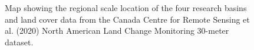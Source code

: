 \documentclass[
  letterpaper,
]{tex/uofsthesis-cs}
\begin{document}
\begin{figure}


\caption{\label{fig-map}Map showing the regional scale location of the
four research basins and land cover data from the Canada Centre for
Remote Sensing et al. (2020) North American Land Change Monitoring
30-meter dataset.}

\end{figure}%
\end{document}
